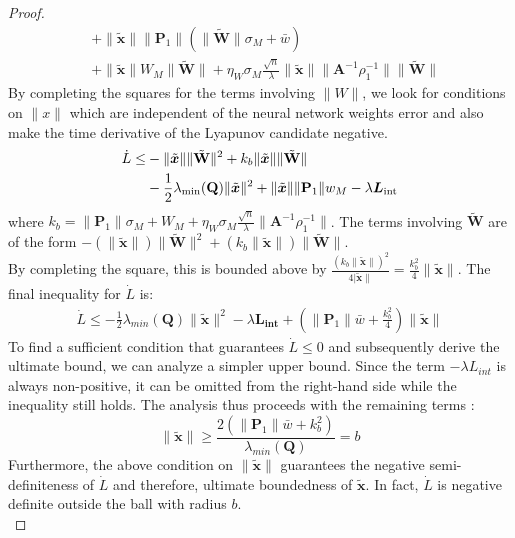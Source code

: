 \documentclass[10pt,twocolumn]{ICCAS}
\newcommand{\xtilde}{\tilde{\bm{x}}}
\newcommand{\Wtilde}{\tilde{\mathbf{W}}}
\begin{document}
\begin{proof}
\begin{align*}
    &+ \|\xtilde\|\|\mathbf{P}_1\|(\|\Wtilde\| \sigma_{M} + \bar{w}) \\
    &+ \|\xtilde\| W_M \|\Wtilde\| 
    + \eta_W \sigma_M \frac{\sqrt{n}}{\lambda}\|\xtilde\| \|{\mathbf{A}^{-1}} \rho_1^{-1}\| \|\Wtilde\|
    \label{eq:Ldot_ineq_full}
\end{align*}
By completing the squares for the terms involving $\|\hat{W}\|$, we look for conditions on $\|x\|$ which are independent of the neural network weights error and also make the time derivative of the Lyapunov candidate negative.
\begin{align}
    \dot{L} \le & - \|\xtilde\| \|\Wtilde\|^2 + k_b\|\xtilde\| \|\Wtilde\| \notag \\
    & - \frac{1}{2}\lambda_{\min}({\mathbf{Q}})\|\xtilde\|^2 
    + \|\xtilde\|\|{\mathbf{P}_1}\|w_M 
    - \lambda \bm{L_{\text{int}}}
\end{align}
where $k_b = \|{\mathbf{P}_1}\|\sigma_M + W_M + \eta_W\sigma_M \frac{\sqrt{n}}{\lambda} \|{\mathbf{A}^{-1}}\rho_1^{-1}\|$. The terms involving $\Wtilde$ are of the form $-(\|\xtilde\|)\|\Wtilde\|^2 + (k_b\|\xtilde\|)\|\Wtilde\|$.\\ 
By completing the square, this is bounded above by $\frac{(k_b\|\xtilde\|)^2}{4|\xtilde\|} = \frac{k_b^2}{4}\|\xtilde\|$.
The final inequality for $\dot{L}$ is:
\begin{align}
    \dot{L} \le -\frac{1}{2}\lambda_{min}({\mathbf{Q}})\|\xtilde\|^2 - \lambda \bm{L_{\text{int}}}+ \left( \|{\mathbf{P}_1}\|{\bar{w}} + \frac{k_b^2}{4} \right)\|\xtilde\|
\end{align}
To find a sufficient condition that guarantees $\dot{L} \le 0$ and subsequently derive the ultimate bound, we can analyze a simpler upper bound. Since the term $-\lambda L_{int}$ is always non-positive, it can be omitted from the right-hand side while the inequality still holds. The analysis thus proceeds with the remaining terms :
\begin{equation}
    \|\xtilde\|\ge\frac{2\left( \|\mathbf{P}_1\|\bar{w} + k_b^2 \right)}{\lambda_{min}(\mathbf{Q})}=b \label{eq:bound_xtilde}
\end{equation}
Furthermore, the above condition on $\|\xtilde\|$ guarantees the negative semi-definiteness of $\dot{L}$ and therefore, ultimate boundedness of $\xtilde$.
In fact, $\dot{L}$ is negative definite outside the ball with radius $b$.\\ 

\end{proof}
\end{document}

